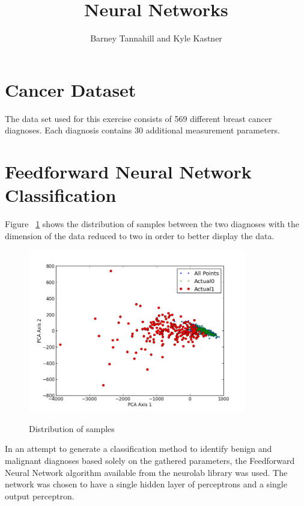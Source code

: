 \documentclass{article}
\begin{document}
\title{Neural Networks}
\author{Barney Tannahill and Kyle Kastner}

\maketitle

\section*{Cancer Dataset}
The data set used for this exercise consists of 569 different breast cancer diagnoses.
Each diagnosis contains 30 additional measurement parameters. 

\section*{Feedforward Neural Network Classification}
Figure ~\ref{fig:f0} shows the distribution of samples between the two diagnoses 
with the dimension of the data reduced to two in order to better display the data.
\begin{figure}[h!]
\caption{Distribution of samples}
  \centering
    \includegraphics[width=0.85\textwidth]{figure_0.png}
  \label{fig:f0}
\end{figure}
In an attempt to generate a classification method to identify benign and malignant diagnoses
based solely on the gathered parameters, the Feedforward Neural Network algorithm 
available from the neurolab library was used.  The network was chosen to have a single
hidden layer of perceptrons and a single output perceptron.
\end{document}
